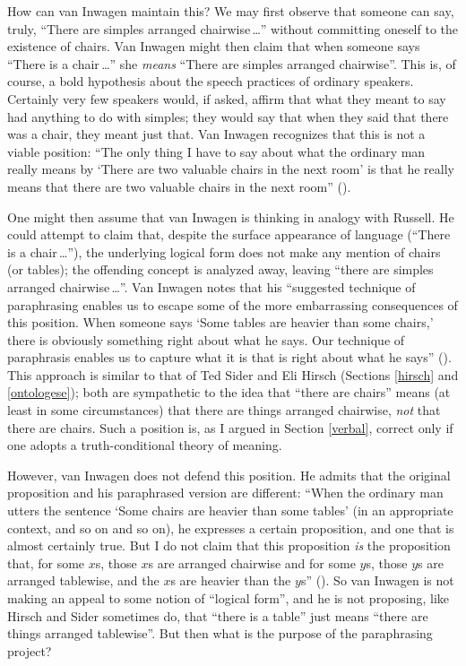 \documentclass[11pt]{article}
\begin{document}
\begin{spacing}{1.5}
How can van Inwagen maintain this?  We may first observe that someone
can say, truly, ``There are simples arranged chairwise\,\ldots ''
without committing oneself to the existence of chairs.  Van Inwagen
might then claim that when someone says ``There is a chair\,\ldots ''
she {\em means} ``There are simples arranged chairwise''.  This is, of
course, a bold hypothesis about the speech practices of ordinary
speakers.  Certainly very few speakers would, if asked, affirm that
what they meant to say had anything to do with simples; they would say
that when they said that there was a chair, they meant just that.  Van
Inwagen recognizes that this is not a viable position: ``The only
thing I have to say about what the ordinary man really means by `There
are two valuable chairs in the next room' is that he really means that
there are two valuable chairs in the next room''
(\citeyear[106]{inwagen1995}).

One might then assume that van Inwagen is thinking in analogy with
Russell.  He could attempt to claim that, despite the surface
appearance of language (``There is a chair\,\ldots ''), the underlying
logical form does not make any mention of chairs (or tables); the
offending concept is analyzed away, leaving ``there are simples
arranged chairwise\,\ldots ''.  Van Inwagen notes that his ``suggested
technique of paraphrasing enables us to escape some of the more
embarrassing consequences of this position.  When someone says `Some
tables are heavier than some chairs,' there is obviously something
right about what he says.  Our technique of paraphrasis enables us to
capture what it is that is right about what he says''
(\citeyear[111]{inwagen1995}).  This approach is similar to that of
Ted Sider and Eli Hirsch (Sections \ref{hirsch} and \ref{ontologese});
both are sympathetic to the idea that ``there are chairs'' means (at
least in some circumstances) that there are things arranged chairwise,
{\em not} that there are chairs.  Such a position is, as I argued in
Section \ref{verbal}, correct only if one adopts a truth-conditional
theory of meaning.

However, van Inwagen does not defend this position.  He admits that
the original proposition and his paraphrased version are different:
``When the ordinary man utters the sentence `Some chairs are heavier
than some tables' (in an appropriate context, and so on and so on), he
expresses a certain proposition, and one that is almost certainly
true.  But I do not claim that this proposition {\em is} the
proposition that, for some $x$s, those $x$s are arranged chairwise and
for some $y$s, those $y$s are arranged tablewise, and the $x$s are
heavier than the $y$s'' (\citeyear[112]{inwagen1995}).  So van Inwagen
is not making an appeal to some notion of ``logical form'', and he is
not proposing, like Hirsch and Sider sometimes do, that ``there is a
table'' just means ``there are things arranged tablewise''.  But then
what is the purpose of the paraphrasing project?


\end{spacing}
\end{document}

